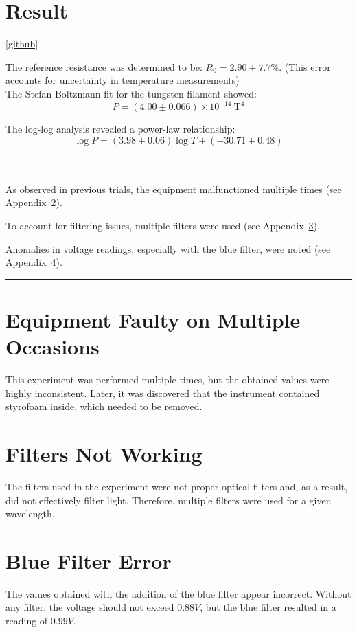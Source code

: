 \documentclass[%
 sor,
 jor,
 amsmath,amssymb,
 reprint,%
]{revtex4-2}
\begin{document}
\section{Result}
\ref{github}

The reference resistance was determined to be: $R_0 = 2.90 \pm 7.7\% $. (This error accounts for uncertainty in temperature measurements)\\

The Stefan-Boltzmann fit for the tungsten filament showed:
$$
P = (4.00 \pm 0.066) \times 10^{-14}\ \mathrm{T^4}
$$

The log-log analysis revealed a power-law relationship:
$$
\log P = (3.98 \pm 0.06)\log T + (-30.71 \pm 0.48)
$$

\noindent{}\\
\\
As observed in previous trials, the equipment malfunctioned multiple times (see Appendix~\ref{appendix:prevexp}).  

To account for filtering issues, multiple filters were used (see Appendix~\ref{appendix:filters}).  

Anomalies in voltage readings, especially with the blue filter, were noted (see Appendix~\ref{appendix:bluefilter}).

\noindent\rule{\linewidth}{0.4pt}
\vspace{2cm}


\appendix
\section{Equipment Faulty on Multiple Occasions} \label{appendix:prevexp}
This experiment was performed multiple times, but the obtained values were highly inconsistent. Later, it was discovered that the instrument contained styrofoam inside, which needed to be removed.  
\section{Filters Not Working} \label{appendix:filters}
The filters used in the experiment were not proper optical filters and, as a result, did not effectively filter light. Therefore, multiple filters were used for a given wavelength.  

\section{Blue Filter Error} \label{appendix:bluefilter}
The values obtained with the addition of the blue filter appear incorrect. Without any filter, the voltage should not exceed $0.88V$, but the blue filter resulted in a reading of $0.99V$.  
\end{document}
